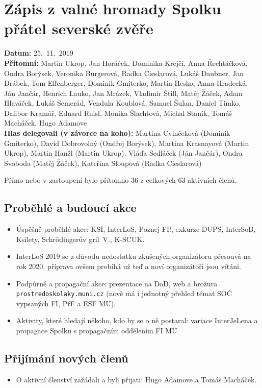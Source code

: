 \documentclass[11pt,a4paper]{article}
\begin{document}
\section*{Zápis z valné hromady Spolku přátel severské zvěře}
\textbf{Datum:} 25.~11.~2019\\
\textbf{Přítomní:} Martin Ukrop, Jan Horáček, Dominika Krejčí, Anna Řechtáčková, Ondra Borýsek, Veronika Burgerová, Radka Cieslarová, Lukáš Daubner, Jan Drábek, Tom Effenberger, Dominik Gmiterko, Martin Hesko, Anna Hradecká, Ján Jančár, Henrich Lauko, Jan Mrázek, Vladimír Štill, Matěj Žáček, Adam Hlaváček, Lukáš Semerád, Vendula Koublová, Samuel Šuľan, Daniel Timko, Dalibor Kramář, Eduard Ruisl, Monika Šlachtová, Michal Staník, Tomáš Macháček, Hugo Adamove \\
\textbf{Hlas delegovali (v závorce na koho):} Martina Cvinčeková (Dominik Gmiterko), David Dobrovolný (Ondřej Borýsek), Martina Krasnayová (Martin Ukrop), Martin Hanžl (Martin Ukrop), Vláďa Sedláček (Ján Jančár), Ondra Svoboda (Matěj Žáček), Kateřina Sloupová (Radka Cieslarová)

\vspace{1em}

\noindent Přímo nebo v zastoupení bylo přítomno 36 z celkových 63 aktivních členů.

\subsection*{Proběhlé a budoucí akce}
\begin{itemize}[itemsep=0pt]
\item Úspěšně proběhlé akce: KSI, InterLoS, Poznej FI!, exkurze DUPS, InterSoB, Ksílety, Schrödingerův gril~V., K-SCUK.
\item InterLoS 2019 se z důvodu nedostatku zkušených organizátoru přesouvá na rok 2020, příprava ovšem probíhá už teď a noví organizátoři jsou vítáni.
\item Podpůrné a propagační akce: prezentace na DoD, web a brožura \texttt{prostredoskolaky.muni.cz} (nově má i jednotný přehled témat SOČ vypsaných FI, PřF a ESF MU).
\item Aktivity, které hledají někoho, kdo by se o ně postaral: variace InterJeLena a propagace Spolku s propagačním oddělením FI MU
\end{itemize}

\subsection*{Přijímání nových členů}
\begin{itemize}[itemsep=0pt]
\item O aktivní členství zažádali a byli přijati: Hugo Adamove a Tomáš Macháček.
\end{itemize}
\end{document}
